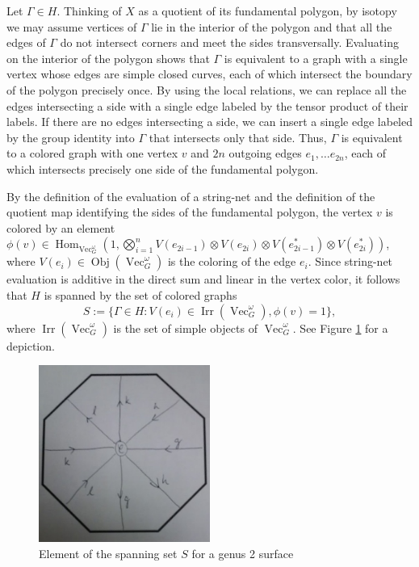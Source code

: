 \documentclass{amsart}
\DeclareMathOperator{\Vect}{Vec}
\DeclareMathOperator{\Hom}{Hom}
\DeclareMathOperator{\Obj}{Obj}
\DeclareMathOperator{\Irr}{Irr}
\begin{document}
Let $\Gamma \in H$. Thinking of $X$ as a quotient of its fundamental polygon, by isotopy we may assume vertices of $\Gamma$ lie in the interior of the polygon and that all the edges of $\Gamma$ do not intersect corners and meet the sides transversally.  Evaluating on the interior of the polygon shows that $\Gamma$ is equivalent to a graph with a single vertex whose edges are simple closed curves, each of which intersect the boundary of the polygon precisely once.  By using the local relations, we can replace all the edges intersecting a side with a single edge labeled by the tensor product of their labels.  If there are no edges intersecting a side, we can insert a single edge labeled by the group identity into $\Gamma$ that intersects only that side.  Thus, $\Gamma$ is equivalent to a colored graph with one vertex $v$ and $2n$ outgoing edges $e_1, \ldots e_{2n}$, each of which intersects precisely one side of the fundamental polygon.






By the definition of the evaluation of a string-net and the definition of the quotient map identifying the sides of the fundamental polygon, the vertex $v$ is colored by an element $\phi(v) \in \Hom_{\Vect_G^\omega} (1, \bigotimes_{i=1}^n V(e_{2i-1}) \otimes V(e_{2i})  \otimes V(e_{2i-1}^*) \otimes V(e_{2i}^*))$, where $V(e_i) \in \Obj(\Vect_G^\omega)$ is the coloring of the edge $e_i$.  Since string-net evaluation is additive in the direct sum and linear in the vertex color, it follows that $H$ is spanned by the set of colored graphs
$$ S := \{\Gamma \in H : V(e_i) \in \Irr(\Vect_G^\omega), \phi(v) = 1 \}, $$
where $\Irr(\Vect_G^\omega)$ is the set of simple objects of $\Vect_G^\omega$.  See Figure \ref{fig:span} for a depiction.

\begin{figure}
\includegraphics[width=0.5\textwidth]{basis.jpg}
\caption{Element of the spanning set $S$ for a genus 2 surface}
\label{fig:span}
\end{figure}
\end{document}
